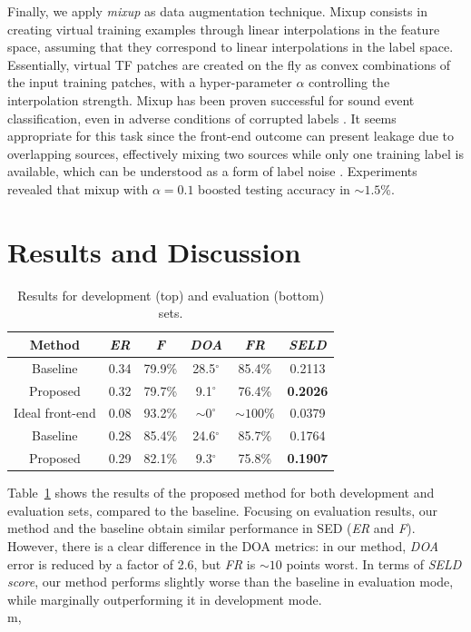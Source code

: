 Finally, we apply \textit{mixup} \cite{zhang2017mixup} as data augmentation technique.
Mixup consists in creating virtual training examples through linear interpolations in the feature space, assuming that they correspond to linear interpolations in the label space.
Essentially, virtual TF patches are created on the fly as convex combinations of the input training patches, with a hyper-parameter $\alpha$ controlling the interpolation strength.
Mixup has been proven successful for sound event classification, even in adverse conditions of corrupted labels \cite{Fonseca2019model}.
It seems appropriate for this task since the front-end outcome can present leakage due to overlapping sources, effectively mixing two sources while only one training label is available, which can be understood as a form of label noise \cite{Fonseca2019learning}.
Experiments revealed that mixup with $\alpha=0.1$ boosted testing accuracy in $\sim1.5$\%. 







\section{Results and Discussion}
\label{sec:results}
\begin{table}[!htbp]
\centering
\caption{Results for development (top) and evaluation (bottom) sets.}

\begin{tabular}{cccccc}
\toprule
Method & \textit{ER} & \textit{F} & \textit{DOA} & \textit{FR} & \textbf{\textit{SELD}}\\
\midrule
Baseline & 0.34 & 79.9\% & 28.5$^{\circ}$  & 85.4\% & 0.2113\\
Proposed & 0.32 & 79.7\% & 9.1$^{\circ}$   & 76.4\% & \textbf{0.2026}\\
Ideal front-end & 0.08 & 93.2\% & $\sim0^{\circ}$   &$ \sim100$\% & 0.0379\\
\midrule
Baseline & 0.28 & 85.4\% & 24.6$^{\circ}$  & 85.7\% &  0.1764\\
Proposed & 0.29 & 82.1\% & 9.3$^{\circ}$   & 75.8\% & \textbf{ 0.1907}\\
\bottomrule
\end{tabular}
\label{tab:results_real}
\end{table}


Table~\ref{tab:results_real} shows the results of the proposed method for both development and evaluation sets, compared to the baseline.
Focusing on evaluation results, our method and the baseline obtain similar performance in SED (\textit{ER} and \textit{F}). However, there is a clear difference in the DOA metrics:
in our method, \textit{DOA} error is reduced by a factor of 2.6, but \textit{FR}  is $\sim10$ points worst.
In terms of \textit{SELD score}, our method performs slightly worse than the baseline in evaluation mode, while marginally outperforming it in development mode. \\m,              

